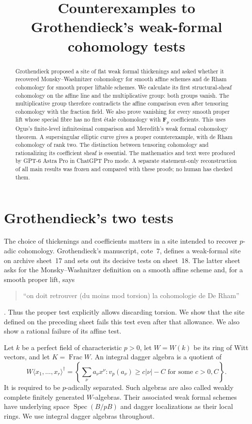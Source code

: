 \documentclass[11pt]{article}
\title{Counterexamples to Grothendieck's weak-formal cohomology tests}
\author{}\date{}
\DeclareMathOperator{\Spec}{Spec}\DeclareMathOperator{\Spwf}{Spwf}
\DeclareMathOperator{\Frac}{Frac}
\theoremstyle{definition}\newtheorem{definition}[theorem]{Definition}
\theoremstyle{remark}\newtheorem{remark}[theorem]{Remark}
\begin{document}
\maketitle
\begin{abstract}
Grothendieck proposed a site of flat weak formal thickenings and asked whether it recovered Monsky--Washnitzer cohomology for smooth affine schemes and de Rham cohomology for smooth proper liftable schemes. We calculate its first structural-sheaf cohomology on the affine line and the multiplicative group: both groups vanish. The multiplicative group therefore contradicts the affine comparison even after tensoring cohomology with the fraction field. We also prove vanishing for every smooth proper lift whose special fibre has no first \'etale cohomology with $\mathbf F_p$ coefficients. This uses Ogus's finite-level infinitesimal comparison and Meredith's weak formal cohomology theorem. A supersingular elliptic curve gives a proper counterexample, with de Rham cohomology of rank two. The distinction between tensoring cohomology and rationalizing its coefficient sheaf is essential. The mathematics and text were produced by GPT-6 Astra Pro in ChatGPT Pro mode. A separate statement-only reconstruction of all main results was frozen and compared with these proofs; no human has checked them.
\end{abstract}

\section{Grothendieck's two tests}

The choice of thickenings and coefficients matters in a site intended to recover $p$-adic cohomology. Grothendieck's manuscript, cote~7, defines a weak-formal site on archive sheet~17 and sets out its decisive tests on sheet~18. The latter sheet asks for the Monsky--Washnitzer definition on a smooth affine scheme and, for a smooth proper lift, says
\begin{quote}
``on doit retrouver (du moins mod torsion) la cohomologie de De Rham''
\end{quote}
\citep[archive sheet~18; scan image~19]{Grothendieck}.
Thus the proper test explicitly allows discarding torsion. We show that the site defined on the preceding sheet fails this test even after that allowance. We also show a rational failure of its affine test.

Let $k$ be a perfect field of characteristic $p>0$, let $W=W(k)$ be its ring of Witt vectors, and let $K=\Frac W$. An integral dagger algebra is a quotient of
\[
 W\langle x_1,\ldots,x_r\rangle^\dagger
 =\left\{\sum_{\nu}a_\nu x^\nu:
       v_p(a_\nu)\geq c|\nu|-C
       \text{ for some }c>0,C\right\}.
\]
It is required to be $p$-adically separated. Such algebras are also called weakly complete finitely generated $W$-algebras. Their associated weak formal schemes have underlying space $\Spec(B/pB)$ and dagger localizations as their local rings. We use integral dagger algebras throughout.
\end{document}
